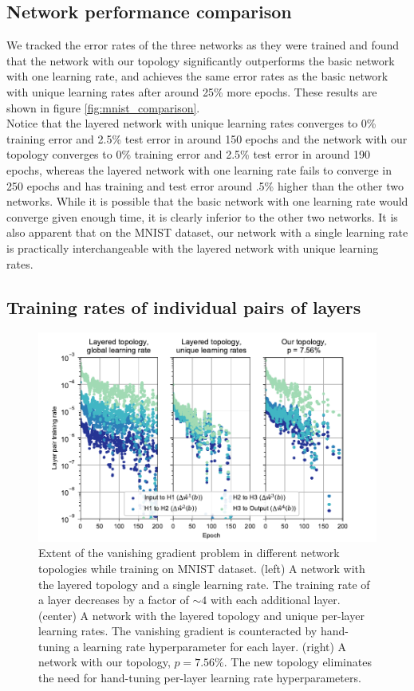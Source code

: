 \documentclass[format=sigconf]{acmart}
\newcommand{\npar}{\\\indent}
\begin{document}
\subsection{Network performance comparison}
\label{sec:network_performance}

We tracked the error rates of the three networks as they were trained and found that the network with our topology significantly outperforms the basic network with one learning rate, and achieves the same error rates as the basic network with unique learning rates after around 25\% more epochs. These results are shown in figure \ref{fig:mnist_comparison}.
\npar
 Notice that the layered network with unique learning rates converges to 0\% training error and 2.5\% test error in around 150 epochs and the network with our topology converges to 0\% training error and 2.5\% test error in around 190 epochs, whereas the layered network with one learning rate fails to converge in 250 epochs and has training and test error around .5\% higher than the other two networks. While it is possible that the basic network with one learning rate would converge given enough time, it is clearly inferior to the other two networks. It is also apparent that on the MNIST dataset, our network with a single learning rate is practically interchangeable with the layered network with unique learning rates.

\subsection{Training rates of individual pairs of layers}
\label{sec:mnist_perlayer}

\begin{figure}
  \centering
  \includegraphics[width=\columnwidth]{figures/MNIST_individual_layers.pdf}
  \caption{Extent of the vanishing gradient problem in different network topologies while training on MNIST dataset. (left) A network with the layered topology and a single learning rate. The training rate of a layer decreases by a factor of $\sim 4$ with each additional layer. (center) A network with the layered topology and unique per-layer learning rates. The vanishing gradient is counteracted by hand-tuning a learning rate hyperparameter for each layer.  (right) A network with our topology, $p = 7.56\%$. The new topology eliminates the need for hand-tuning per-layer learning rate hyperparameters.}  
  \label{fig:mnist_layers}
\end{figure}
\end{document}
